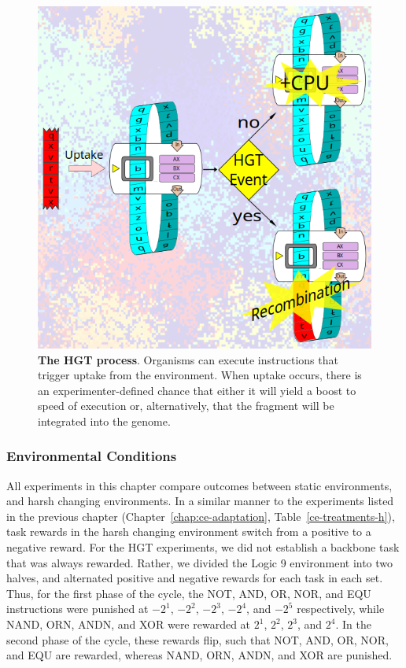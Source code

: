 \documentclass[PhD]{msu-thesis}
\begin{document}
\begin{figure}[h!]
\begin{center}
\includegraphics[width=0.7\columnwidth]{figures/HGT/hgt_figure.png}
\caption{\textbf{The HGT process}. Organisms can execute instructions that trigger uptake from the environment. When uptake occurs, there is an experimenter-defined chance that either it will yield a boost to speed of execution or, alternatively, that the fragment will be integrated into the genome.
}\label{fig:hgtprocess}
\end{center}
\end{figure}

\subsubsection{Environmental Conditions}
All experiments in this chapter compare outcomes between static environments, and harsh changing environments. In a similar manner to the experiments listed in the previous chapter (Chapter~\ref{chap:ce-adaptation}, Table~\ref{ce-treatments-h}), task rewards in the harsh changing environment switch from a positive to a negative reward. For the HGT experiments, we did not establish a backbone task that was always rewarded. Rather, we divided the Logic 9 environment into two halves, and alternated positive and negative rewards for each task in each set. Thus, for the first phase of the cycle, the NOT, AND, OR, NOR, and EQU instructions were punished at $-2^1$, $-2^2$, $-2^3$, $-2^4$, and $-2^5$ respectively, while NAND, ORN, ANDN, and XOR were rewarded at $2^1$, $2^2$, $2^3$, and $2^4$. In the second phase of the cycle, these rewards flip, such that NOT, AND, OR, NOR, and EQU are rewarded, whereas NAND, ORN, ANDN, and XOR are punished.
\end{document}

